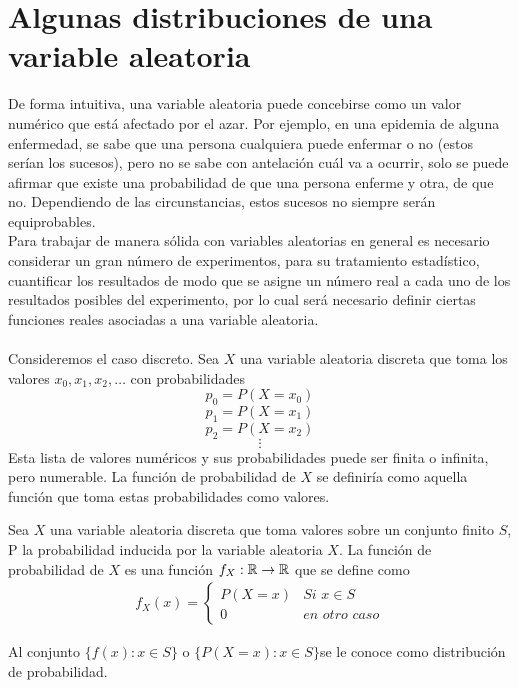 \section{Algunas distribuciones de una variable aleatoria}
De forma intuitiva, una variable aleatoria puede concebirse como un valor numérico que está afectado por el azar. Por ejemplo, en una epidemia de alguna enfermedad, se sabe que una persona cualquiera puede enfermar o no (estos serían los sucesos), pero no se sabe con antelación cuál va a ocurrir, solo se puede afirmar que existe una probabilidad de que una persona enferme y otra, de que no. Dependiendo de las circunstancias, estos sucesos no siempre serán equiprobables.\\
Para trabajar de manera sólida con variables aleatorias en general es necesario considerar un gran número de experimentos, para su tratamiento estadístico, cuantificar los resultados de modo que se asigne un número real a cada uno de los resultados posibles del experimento, por lo cual será necesario definir ciertas funciones reales asociadas a una variable aleatoria.
\\\\
Consideremos el caso discreto. Sea $X$ una variable aleatoria discreta que toma los valores $x_0,x_1,x_2,\ldots$ con probabilidades
$$p_0=P(X=x_0)$$
$$p_1=P(X=x_1)$$
$$p_2=P(X=x_2)$$
$$\vdots$$
Esta lista de valores numéricos y sus probabilidades puede ser finita o infinita, pero numerable. La función de probabilidad de $X$ se definiría como aquella función que toma estas probabilidades como valores.
\begin{Def}
    Sea $X$ una variable aleatoria discreta que toma valores sobre un conjunto finito $S$, P la probabilidad inducida por la variable aleatoria $X$. La función de probabilidad de $X$ es una función  $f_{X}:{\mathbb{R}}\rightarrow{\mathbb{R}}$ que se define como
    \begin{eqnarray*}
        f_{X}(x)=
        \begin{cases}
            P(X=x) &\textit{Si }x\in S\\0 &\textit{en otro caso}\label{def-funcionProbabilidad}
        \end{cases}
    \end{eqnarray*}
\end{Def}
\begin{Def}
\label{def-distribuciónProb}
    Al conjunto $\{f(x): x\in S\}$ o $\{P(X=x): x\in S\} $se le conoce como distribución de probabilidad.
\end{Def}
